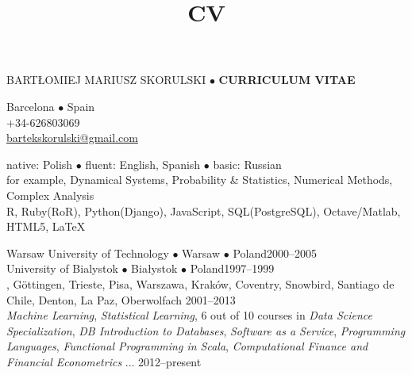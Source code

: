 \documentclass[a4paper, twoside]{scrreprt}
\title{CV}
\author{}
\date{}
\begin{document}
\noindent BARTŁOMIEJ MARIUSZ SKORULSKI $\bullet$ {\bf CURRICULUM VITAE}
\vspace{-0.3cm}

\noindent\makebox[\linewidth]{\rule{\textwidth}{0.4pt}}

{\small
\noindent\llap{\FA \faHome\ \ } Barcelona $\bullet$ Spain\\
\noindent\llap{\FA \faMobilePhone\ \ \ }+34-626803069\\
\noindent\llap{\FA \faEnvelope\ \ }\href{mailto:bartekskorulski@gmail.com}{bartekskorulski@gmail.com}
}\\
\noindent\makebox[\linewidth]{\rule{\textwidth}{0.4pt}}

\vspace{0.1cm}


\noindent{} native: Polish $\bullet$ fluent: English, Spanish $\bullet$ basic: Russian \\
\noindent{} for example, Dynamical Systems, Probability \& Statistics, Numerical Methods, 
Complex Analysis\\
\noindent{} R, Ruby(RoR), Python(Django),  JavaScript, SQL(PostgreSQL), Octave/Matlab, HTML5, 
\LaTeX \\
\noindent\makebox[\linewidth]{\rule{\textwidth}{0.4pt}}

\vspace{0.1cm}
 Warsaw University of Technology $\bullet$ Warsaw $\bullet$ Poland\hfill 2000--2005\\
 University of Bialystok $\bullet$ Białystok $\bullet$ Poland\hfill 1997--1999\\
, Göttingen, Trieste, Pisa, Warszawa, Kraków, Coventry, Snowbird, Santiago de Chile, Denton, 
La Paz, Oberwolfach  \hfill 2001--2013\\
 \emph{Machine Learning}, \emph{Statistical Learning}, 6 out of 10 courses in \emph{Data Science Specialization}, \emph{DB Introduction to Databases}, \emph{Software as a Service}, \emph{Programming Languages}, \emph{Functional Programming in Scala}, \emph{Computational Finance and Financial Econometrics} ... \hfill 2012--present\\
\noindent\makebox[\linewidth]{\rule{\textwidth}{0.4pt}}
\end{document}
